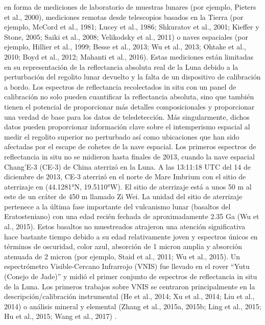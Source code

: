 \documentclass[12pt]{article}
\begin{document}
en forma de mediciones de laboratorio de muestras lunares (por ejemplo, Pieters et al., 2000), 
mediciones remotas desde telescopios basados en la Tierra (por ejemplo, McCord et al., 1981; 
Lucey et al., 1986; Shkuratov et al., 2001; Kieffer y Stone, 2005; Saiki et al., 2008; Velikodsky et al., 2011) 
o naves espaciales (por ejemplo, Hillier et al., 1999; Besse et al., 2013; Wu et al., 2013; 
Ohtake et al., 2010; Boyd et al., 2012; Mahanti et al., 2016). Estas mediciones están limitadas
en su representación de la reflectancia absoluta real de la Luna debido a la perturbación 
del regolito lunar devuelto 
y la falta de un dispositivo de calibración a bordo. Los espectros de reflectancia recolectados 
in situ con un panel de calibración no solo pueden cuantificar la reflectancia absoluta, 
sino que también tienen el potencial de proporcionar más detalles composicionales y 
proporcionar una verdad de base para los datos de teledetección. 
Más singularmente, dichos datos pueden proporcionar información clave sobre el intemperismo 
espacial al medir el regolito superior no perturbado 
así como ubicaciones que han sido afectadas por el escape de cohetes de la nave espacial. 
Los primeros espectros de reflectancia in situ no se midieron hasta finales de 2013, cuando 
la nave espacial Chang'E-3 (CE-3) de China aterrizó en la Luna. 
A las 13:11:18 UTC del 14 de diciembre de 2013, CE-3 aterrizó en el norte de Mare Imbrium 
con el sitio de aterrizaje en 
(44.1281°N, 19.5110°W). El sitio de aterrizaje está a unos 50 m al este de un cráter de 450 m 
llamado Zi Wei. 
La unidad del sitio de aterrizaje pertenece a la última fase importante del vulcanismo lunar 
(basaltos del Eratosteniano) con una edad recién fechada de aproximadamente 2.35 Ga (Wu et al., 2015). 
Estos basaltos no muestreados atrajeron una atención significativa hace bastante tiempo debido a 
su edad relativamente joven y espectros únicos en términos de oscuridad, color azul, absorción de 
1  micron amplia y absorción atenuada de 2 micron (por ejemplo, Staid et al., 2011; Wu et al., 2015). 
Un espectrómetro Visible-Cercano Infrarrojo (VNIS) fue llevado en el rover “Yutu (Conejo de Jade)” 
y midió el primer conjunto de espectros de reflectancia in situ de la Luna. 
Los primeros trabajos sobre VNIS se centraron principalmente en la descripción/calibración instrumental 
(He et al., 2014; Xu et al., 2014; Liu et al., 2014) o análisis mineral y elemental 
(Zhang et al., 2015a, 2015b; Ling et al., 2015; Hu et al., 2015; Wang et al., 2017) \parencite{McCord}.\\
\\
\end{document}
